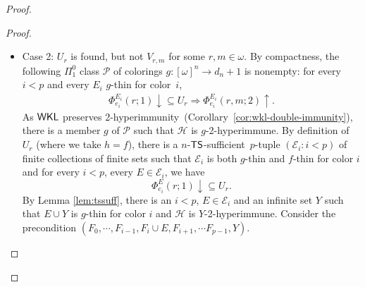 \documentclass{amsart}
\theoremstyle{definition}
\theoremstyle{remark}
\numberwithin{equation}{section}
\theoremstyle{noparens}
\def\propertyL{2-hyperimmunity}
\def\hyper{2-hyperimmune}
\def\mcal{\mathcal}
\newcommand{\Hcal}{\mathcal{H}}
\newcommand{\Pcal}{\mathcal{P}}
\newcommand{\Rcal}{\mathcal{R}}
\newcommand{\p}[1]{\left( #1 \right)}
\newcommand{\s}[1]{\ensuremath{\sf{#1}}}
\DeclareMathOperator{\wkl}{\s{WKL}}
\DeclareMathOperator{\ts}{\s{TS}}
\def\tssufficient{$\ts$-sufficient}
\begin{document}
\begin{proof}
\begin{proof}
\begin{itemize}
	As $\wkl$ preserves \propertyL\
	(Corollary~\ref{cor:wkl-double-immunity}), there is a member  $g, h $ of
	  $\Pcal$ such that
	$\Hcal$ is $g \oplus h  $-\hyper.
Unfolding the definition of $n$-\tssufficient\ and using compactness,
the following $\Pi_1^{0,g\oplus h}$ class $\mcal{Q}$ of
sequence $(f_{s,j}:[\omega]^s\rightarrow  d_n+1)_{0\leq s<n,j<d_{n-s-1}}$	
of colorings is nonempty:
for every $i<p$, every finite set $E$ which is both $g$-thin, $h$-thin for color $i$
and is $f_{s,j}$-thin for color $i$ for all $0\leq s<n,j<d_{n-s-1}$, we have
$
	\Phi_{e_i}^{ E}(r;1) \uparrow.
	$

As $\wkl$ preserves \propertyL\
	(Corollary~\ref{cor:wkl-double-immunity}), there is a member  $(f_{s,j}:0\leq s<n,j<d_{n-s-1})$	 of
	  $\mcal{Q}$ such that
$\Hcal$ is $g\oplus h\oplus_{0\leq s<n,j<d_{n-s-1}}f_{s,j}$-\hyper.
Since $\ts^s_{d_{s-1}+1}$ preserves \propertyL\ for all $0\leq s\leq n$,
there is an infinite set $Y$ such that
$|f_{s,j}[Y]^s|\leq d_{s-1}$ for all $0\leq s<n,j<d_{n-s-1}$, $|g[Y]^s|,|h[Y]^s|\leq d_{n-1}$
and $\Hcal$ is $Y$-\hyper.
Since $p> \p$,
there is an $i<p$ such that $Y$ is $f_{s,j}$-thin for color $i$
for all $0\leq s<n,j<d_{n-s-1}$ and both $g$-thin, $h$-thin for color $i$.

Clearly $d = (F_0, \dots, F_{p-1}, Y)$ is an extension of $c$
\footnote{When we say ``extension of $c$", we mean a precondition extending $c$.}.
We prove that
$d$ forces $\Rcal_{e_0, \dots, e_{p-1}}$.
This is because if $G_i$ satisfies $(F_i,Y)$, then $G_i$ is both $g$-thin and $h$-thin for color $i$
and $f_{s,j}$-thin for color $i$ for all $0\leq s<n,j<d_{n-s-1}$.
Thus, by definition of $g,h,(f_{s,j}:0\leq s<n,j<d_{n-s-1}) $,
we have $\Phi_{e_i}^{ G_i}(r;1) \uparrow$.

	\bigskip

	\item Case 2: $U_r$ is found, but not $V_{r,m}$ for some $r, m \in \omega$. By compactness,
	the following $\Pi^{0}_1$ class $\Pcal$ of colorings $g : [\omega]^n \to d_n+1$ is nonempty:
	 for every $i < p$ and every $E_i  $ $g$-thin for color~$i$,
\begin{align}\label{fsts-tsnstrongpreserve-defofg}
	\Phi_{e_i}^{  E_i }(r;1) \downarrow \subseteq U_r
		\Rightarrow \Phi_{e_i}^{  E_i }(r, m;2) \uparrow.
	\end{align}
	  As $\wkl$ preserves \propertyL\
	(Corollary~\ref{cor:wkl-double-immunity}), there is a member $g  $
of $\Pcal$ such that $\Hcal$ is $g  $-\hyper.
	By definition of $U_r$ (where we take $h = f$), there
is a $n$-\tssufficient\ $p$-tuple $(\mcal{E}_i:i<p)$ of
finite collections of finite sets
such that $\mcal{E}_i$ is both $g$-thin and $f$-thin for color $i$
and for every $i<p$, every $ E\in\mcal{E}_i$, we have
	$$
	\Phi_{e_i}^{ E}(r;1) \downarrow \subseteq U_r.
	$$
By Lemma \ref{lem:tssuff}, there is an $i<p$, $E\in\mcal{E}_i$
and an infinite set $Y$ such that $E\cup Y$ is $g$-thin for color $i$
and $\Hcal$ is $Y$-\hyper.
Consider the precondition $(F_0,\cdots,F_{i-1},F_i\cup E,F_{i+1},\cdots F_{p-1},Y)$.



\end{itemize}
\end{proof}
\end{proof}
\end{document}
